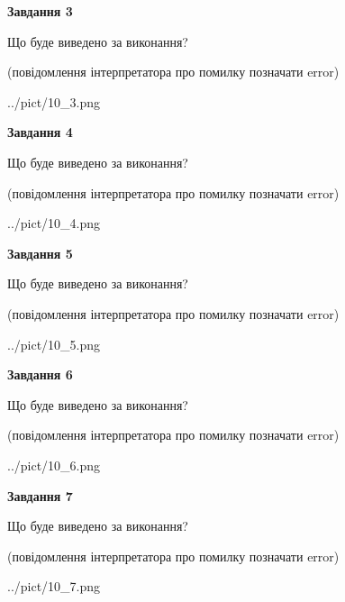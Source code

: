 \documentclass[12pt, ukrainian]{article}
\begin{document}
{\begin {large}
{\begin {center}\textbf{Завдання 3}\end {center}}\par
Що буде виведено за виконання?\par
 (повідомлення інтерпретатора про помилку позначати error)\par
\begin{center}
	{../pict/10_3.png}
\end{center}
\newpage

{\begin {center}\textbf{Завдання 4}\end {center}}\par
Що буде виведено за виконання?\par
 (повідомлення інтерпретатора про помилку позначати error)\par
\begin{center}
	{../pict/10_4.png}
\end{center}
\newpage

{\begin {center}\textbf{Завдання 5}\end {center}}\par
Що буде виведено за виконання?\par
 (повідомлення інтерпретатора про помилку позначати error)\par
\begin{center}
	{../pict/10_5.png}
\end{center}
\newpage

{\begin {center}\textbf{Завдання 6}\end {center}}\par
Що буде виведено за виконання?\par
 (повідомлення інтерпретатора про помилку позначати error)\par
\begin{center}
	{../pict/10_6.png}
\end{center}
\newpage

{\begin {center}\textbf{Завдання 7}\end {center}}\par
Що буде виведено за виконання?\par
 (повідомлення інтерпретатора про помилку позначати error)\par
\begin{center}
	{../pict/10_7.png}
\end{center}
\newpage


\end{large}}
\end{document}
